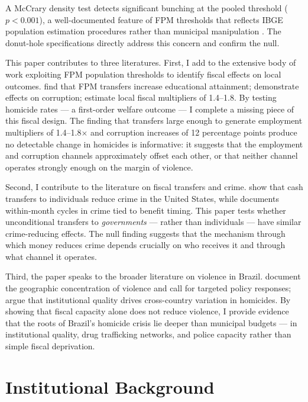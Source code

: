 \documentclass[12pt]{article}
\begin{document}
A McCrary density test detects significant bunching at the pooled threshold ($p < 0.001$), a well-documented feature of FPM thresholds that reflects IBGE population estimation procedures rather than municipal manipulation \citep{litschig2012internal}. The donut-hole specifications directly address this concern and confirm the null.

This paper contributes to three literatures. First, I add to the extensive body of work exploiting FPM population thresholds to identify fiscal effects on local outcomes. \citet{litschig2013impact} find that FPM transfers increase educational attainment; \citet{brollo2013political} demonstrate effects on corruption; \citet{corbi2019fiscal} estimate local fiscal multipliers of 1.4--1.8. By testing homicide rates --- a first-order welfare outcome --- I complete a missing piece of this fiscal design. The finding that transfers large enough to generate employment multipliers of 1.4--1.8$\times$ and corruption increases of 12 percentage points produce no detectable change in homicides is informative: it suggests that the employment and corruption channels approximately offset each other, or that neither channel operates strongly enough on the margin of violence.

Second, I contribute to the literature on fiscal transfers and crime. \citet{dix2017economic} show that cash transfers to individuals reduce crime in the United States, while \citet{foley2011effect} documents within-month cycles in crime tied to benefit timing. This paper tests whether unconditional transfers to \textit{governments} --- rather than individuals --- have similar crime-reducing effects. The null finding suggests that the mechanism through which money reduces crime depends crucially on who receives it and through what channel it operates.

Third, the paper speaks to the broader literature on violence in Brazil. \citet{cerqueira2017atlas} document the geographic concentration of violence and call for targeted policy responses; \citet{soares2006development} argue that institutional quality drives cross-country variation in homicides. By showing that fiscal capacity alone does not reduce violence, I provide evidence that the roots of Brazil's homicide crisis lie deeper than municipal budgets --- in institutional quality, drug trafficking networks, and police capacity \citep{magaloni2020living} rather than simple fiscal deprivation.

\section{Institutional Background}
\end{document}

